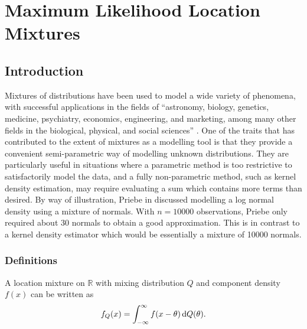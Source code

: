 \chapter{Maximum Likelihood Location Mixtures}
\label{Ch:Mixtures}


\graphicspath{{Figures/Mixtures/}}


\section{Introduction}
	Mixtures of distributions have been used to model a wide variety of phenomena, with successful applications in the fields of ``astronomy, biology, genetics, medicine, psychiatry, economics, engineering, and marketing, among many other fields in the biological, physical, and social sciences'' \cite[Chapter 1]{McLachlan2004-ik}. One of the traits that has contributed to the extent of mixtures as a modelling tool is that they provide a convenient semi-parametric way of modelling unknown distributions. They are particularly useful in situations where a parametric method is too restrictive to satisfactorily model the data, and a fully non-parametric method, such as kernel density estimation, may require evaluating a sum which contains more terms than desired. By way of illustration, Priebe in \cite{Priebe1994-ng} discussed modelling a log normal density using a mixture of normals. With $n = 10000$ observations, Priebe only required about 30 normals to obtain a good approximation. This is in contrast to a kernel density estimator which would be essentially a mixture of 10000 normals.


	\subsection{Definitions}
		A location mixture on $\mathbb{R}$ with mixing distribution $Q$ and component density $f(x)$ can be written as
		\begin{equation}
			f_Q(x) = \int_{-\infty}^\infty f(x-\theta) \, \mathrm{d} Q(\theta).
		\label{eq:mixtureint}
		\end{equation}

